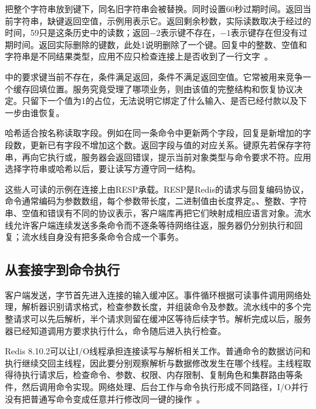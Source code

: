 把整个字符串放到键下，同名旧字符串会被替换。同时设置60秒过期时间。返回当前字符串，缺键返回空值，示例用表示它。返回剩余秒数，实际读数取决于经过的时间，59只是这条历史中的读数；返回$-2$表示键不存在，$-1$表示键存在但没有过期时间。返回实际删除的键数，此处1说明删除了一个键。回复中的整数、空值和字符串是不同结果类型，应用不应只检查连接上是否收到了一行文字~\cite{redis8102-commands}。

中的要求键当前不存在，条件满足返回，条件不满足返回空值。它常被用来竞争一个缓存回填位置。服务究竟受理了哪项业务，则由该值的完整结构和恢复协议决定。只留下一个值为1的占位，无法说明它绑定了什么输入、是否已经付款以及下一步由谁恢复。

哈希适合按名称读取字段。例如在同一条命令中更新两个字段，回复是新增加的字段数，更新已有字段不增加这个数。返回字段与值的对应关系。键原先若保存字符串，再向它执行或，服务器会返回错误，提示当前对象类型与命令要求不符。应用选择字符串或哈希以后，要让读写方遵守同一结构。


这些人可读的示例在连接上由RESP承载。RESP是Redis的请求与回复编码协议，命令通常编码为参数数组，每个参数带长度，二进制值由长度界定。、整数、字符串、空值和错误有不同的协议表示，客户端库再把它们映射成相应语言对象。流水线允许客户端连续发送多条命令而不逐条等待网络往返，服务器仍分别执行和回复；流水线自身没有把多条命令合成一个事务。

\subsection{从套接字到命令执行}

客户端发送，字节首先进入连接的输入缓冲区。事件循环根据可读事件调用网络处理，解析器识别请求格式，检查参数长度，并组装命令及参数。流水线中的多个完整请求可以先后解析，半个请求则留在缓冲区等待后续字节。解析完成以后，服务器已经知道调用方要求执行什么，命令随后进入执行检查。

Redis 8.10.2可以让I/O线程承担连接读写与解析相关工作。普通命令的数据访问和执行继续交回主线程，因此要分别观察解析与数据修改发生在哪个线程。主线程取得待执行请求后，检查命令、参数、权限、内存限制、复制角色和集群路由等条件，然后调用命令实现。网络处理、后台工作与命令执行形成不同路径，I/O并行没有把普通写命令变成任意并行修改同一键的\mbox{操作~\cite{redis8102-source}。}

